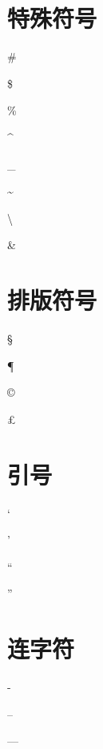\documentclass{ctexart}
\begin{document}
	\section{特殊符号}
	
	\# %
	
	\$ %
	
	\% %
	
	\^{} %
	
	\_{} %
	
	\~{} %
	
	\textbackslash %
	
	\& %
	
	\section{排版符号}
	
	\S
	
	\P
	
	\dag
	
	\ddag
	
	\copyright
	
	\pounds
	
	\section{引号}
	
	` %
	
	' %
	
	`` %
	
	'' %
	
	\section{连字符}
	
	- %
	
	-- %
	
	--- %
	
\end{document}
